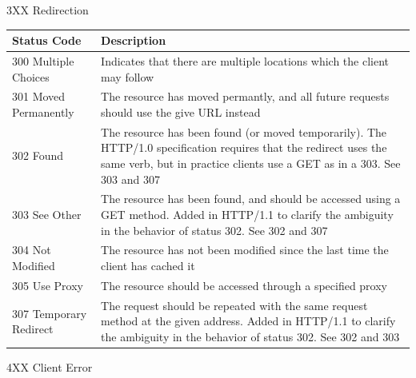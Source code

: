 \documentclass[final]{beamer}
\begin{document}
\begin{frame}{}
\begin{block}{\huge 3XX Redirection}
      \begin{tabular}{p{} p{}}
        Status Code & Description \\ \hline
        300 Multiple Choices & Indicates that there are multiple locations which the client may follow \\
        301 Moved Permanently & The resource has moved permantly, and all future requests should use the give URL instead \\
        302 Found & The resource has been found (or moved temporarily). The HTTP/1.0 specification requires that the redirect uses the same verb, but in practice clients use a GET as in a 303. See 303 and 307 \\
        303 See Other & The resource has been found, and should be accessed using a GET method. Added in HTTP/1.1 to clarify the ambiguity in the behavior of status 302. See 302 and 307 \\
        304 Not Modified & The resource has not been modified since the last time the client has cached it \\
        305 Use Proxy & The resource should be accessed through a specified proxy \\
        307 Temporary Redirect & The request should be repeated with the same request method at the given address. Added in HTTP/1.1 to clarify the ambiguity in the behavior of status 302. See 302 and 303
      \end{tabular}
    \end{block}
    \begin{block}{\huge 4XX Client Error}

      \vspace{0.3in}


\end{block}
\end{frame}
\end{document}
